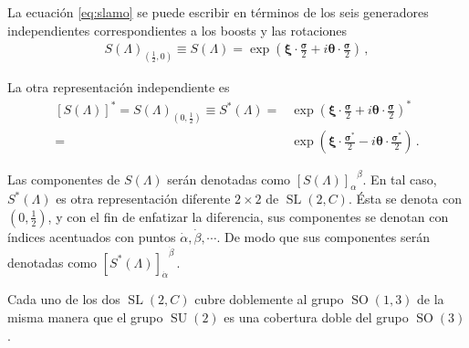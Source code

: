 \begin{frame}
La ecuación \eqref{eq:slamo} se puede escribir en términos de los seis generadores independientes correspondientes a los boosts y las rotaciones
\begin{align}
\label{eq:SLet}
  S(\Lambda)_{\left( \frac{1}{2},0 \right)}\equiv S(\Lambda)=
\exp\left( \boldsymbol{\xi}\cdot \frac{\boldsymbol{\sigma}}{2}+i\boldsymbol{\theta}\cdot \frac{\boldsymbol{\sigma}}{2} \right)\,,
\end{align}


La otra representación independiente es
\begin{align}
\label{eq:SLet}
\left[S(\Lambda)\right]^{*} = S(\Lambda)_{\left(0,\frac{1}{2} \right)}\equiv S^{*}(\Lambda)=&
\exp\left( \boldsymbol{\xi}\cdot \frac{\boldsymbol{\sigma}}{2}+i\boldsymbol{\theta}\cdot \frac{\boldsymbol{\sigma}}{2} \right)^{*}\nonumber\\
=&\exp\left( \boldsymbol{\xi}\cdot \frac{\boldsymbol{\sigma}^{*}}{2}-i\boldsymbol{\theta}\cdot \frac{\boldsymbol{\sigma}^{*}}{2} \right)\,.
\end{align}
 
Las componentes de $S(\Lambda)$ serán denotadas como  ${\left[ S(\Lambda) \right]_{\alpha}}^{\beta}$. En tal caso, $S^{*}(\Lambda)$ es otra representación diferente $2\times 2$ de $\operatorname{SL}(2,C)$. Ésta se denota con $\left( 0,\frac{1}{2}\right)$, y con el fin de enfatizar la diferencia, sus componentes se denotan con índices acentuados con puntos  $\dot{\alpha},\dot{\beta},\cdots$. De modo que sus componentes serán denotadas como ${\left[ S^{*}(\Lambda) \right]_{\dot{\alpha}}}^{\dot{\beta}}$\,.
\end{frame}

Cada uno de los dos $\operatorname{SL}(2,C)$ cubre doblemente al grupo $\operatorname{SO}(1,3)$ de la misma manera que el grupo $\operatorname{SU}(2)$ es una cobertura doble del grupo $\operatorname{SO}(3)$.

